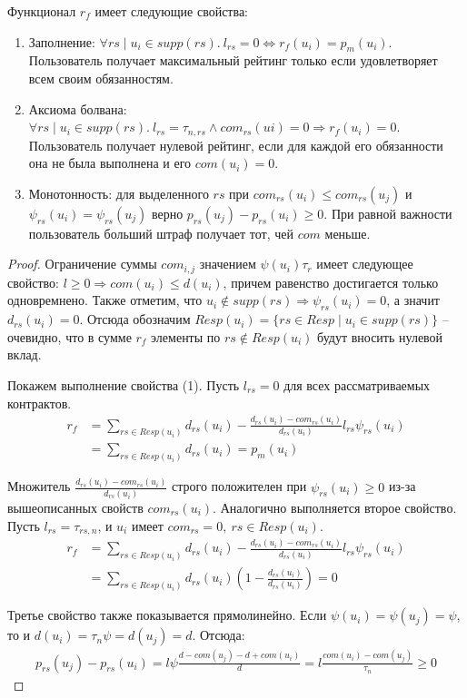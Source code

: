 \documentclass[specification,annotation]{itmo-student-thesis}
\begin{document}
\begin{lemma}
Функционал $r_f$ имеет следующие свойства:
\begin{enumerate}
\item Заполнение: $\forall rs \mid u_i \in supp(rs) . \ l_{rs} = 0
  \Leftrightarrow r_f(u_i) = p_m(u_i)$. Пользователь получает максимальный
  рейтинг только если удовлетворяет всем своим обязанностям.
\item Аксиома болвана: $\forall rs \mid u_i \in supp(rs) . \ l_{rs} = \tau_{n,rs}
   \wedge com_{rs}(ui) = 0 \Rightarrow r_f(u_i) = 0$. Пользователь
  получает нулевой рейтинг, если для каждой его обязанности она не
  была выполнена и его $com(u_i) = 0$.
\item Монотонность: для выделенного $rs$ при $com_{rs}(u_i) \leq
  com_{rs}(u_j)$ и $\psi_{rs}(u_i) = \psi_{rs}(u_j)$ верно
  $p_{rs}(u_j) - p_{rs}(u_i) \ge 0$. При равной важности пользователь
  больший штраф получает тот, чей $com$ меньше.
\end{enumerate}
\end{lemma}
\begin{proof}
Ограничение суммы $com_{i,j}$ значением $\psi(u_i) \tau_r$ имеет
следующее свойство: $l \ge 0 \Rightarrow com(u_i) \le d(u_i)$, причем
равенство достигается только одновремнено. Также отметим, что $u_i
\notin supp(rs) \Rightarrow \psi_{rs}(u_i) = 0$, а значит $d_{rs}(u_i)
= 0$. Отсюда обозначим $Resp(u_i) = \{rs \in Resp \mid u_i \in
supp(rs) \}$ -- очевидно, что в сумме $r_f$ элементы по $rs \notin
Resp(u_i)$ будут вносить нулевой вклад.

Покажем выполнение свойства (1). Пусть $l_{rs} = 0$ для всех
рассматриваемых контрактов.
\begin{align*}
  r_f &= \sum_{rs \in Resp(u_i)}{d_{rs}(u_i)  -  \frac{d_{rs}(u_i) - com_{rs}(u_i)}{d_{rs}(u_i)} l_{rs} \psi_{rs}(u_i)} \\
      &= \sum_{rs \in Resp(u_i)}{d_{rs}(u_i)} = p_m(u_i)
\end{align*}

Множитель $\frac{d_{rs}(u_i) - com_{rs}(u_i)}{d_{rs}(u_i)}$ строго
положителен при $\psi_{rs}(u_i) \ge 0$ из-за вышеописанных свойств
$com_{rs}(u_i)$. Аналогично выполняется второе свойство. Пусть $l_{rs}
= \tau_{rs,n}$, и $u_i$ имеет $com_{rs} = 0 , \ rs \in Resp(u_i)$.
\begin{align*}
  r_f &= \sum_{rs \in Resp(u_i)}{d_{rs}(u_i)  -  \frac{d_{rs}(u_i) - com_{rs}(u_i)}{d_{rs}(u_i)} l_{rs} \psi_{rs}(u_i)} \\
      &= \sum_{rs \in Resp(u_i)}{d_{rs}(u_i)(1  -  \frac{d_{rs}(u_i)}{d_{rs}(u_i)})} = 0
\end{align*}

Третье свойство также показывается прямолинейно. Если $\psi(u_i) =
\psi(u_j) = \psi$, то и $d(u_i) = \tau_n \psi = d(u_j) = d$. Отсюда:
\begin{align*}
p_{rs}(u_j) - p_{rs}(u_i) = l \psi \frac{d - com(u_j) - d + com(u_i)}{d} = l \frac{com(u_i) - com(u_j)}{\tau_n} \ge 0
\end{align*}

\end{proof}
\end{document}
